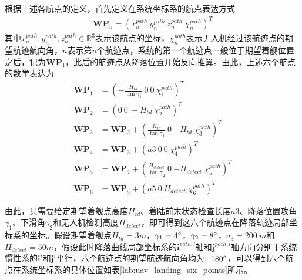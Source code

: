 根据上述各航点的定义，首先定义在系统坐标系的航点表达方式
\begin{align}
\mathbf{WP}_n = (x_n^{path}\ y_n^{path} \ z_n^{path}\ \chi_n^{path})^T
\end{align}
其中$x_n^{path}, y_n^{path}, z_n^{path} \in \mathbb{R}^3$表示该航点的坐标，$\chi_n^{path}$表示无人机经过该航迹点的期望航迹航向角，$n$表示第$n$个航迹点，系统的第一个航迹点一般位于期望着舰位置之后，记为$\mathbf{WP}_1$，此后的航迹点从降落位置开始反向推算。由此，上述六个航点的数学表达为
\begin{align}
\mathbf{WP}_1 &= (-\frac{H_{td}}{\tan{\gamma_1}}\ 0 \ 0\ \chi_1^{path})^T \\
\mathbf{WP}_2 &= (0\ 0 \ -H_{td}\ \chi_2^{path})^T \\
\mathbf{WP}_3 &= \mathbf{WP}_2 + (\frac{H_{td}}{\tan{\gamma_1}}\ 0 \ {-H_{td}}\ \chi_3^{path})^T\\
\mathbf{WP}_4 &= \mathbf{WP}_3+ (a3 \ 0 \ 0\ \chi_4^{path})^T \\
\mathbf{WP}_5 &= \mathbf{WP}_4 + (\frac{H_{detect}}{\tan{\gamma_2}}\ 0 \ {-H_{detect}}\ \chi_5^{path})^T \\
\mathbf{WP}_6 &= \mathbf{WP}_5 + (a5\ 0 \ H_{detect}\ \chi_6^{path})^T 
\end{align}

由此，只需要给定期望着舰点高度$H_{td}$、着陆前末状态检查长度$a3$、降落位置攻角$\gamma_1$、下滑角$\gamma_2$和无人机检测高度$H_{detect}$，即可得到这六个航迹点在降落轨迹局部坐标系的坐标。假设期望着舰点$H_{td} = 3 m$，$\gamma_1=4 \degree$，$\gamma_2=8\degree$，$a_3 = 200\ m$和$H_{detect} = 50 m$，假设此时降落曲线局部坐标系的$\mathbf{i}^{path,l}$轴和$\mathbf{j}^{path,l}$轴方向分别于系统惯性系的$\mathbf{i}^{i}$和$\mathbf{j}^i$平行，六个航迹点的期望航迹航向角均为$-180\degree$，可以得到六个航点在系统坐标系的具体位置如表\ref{lab:uav_landing_six_points}所示。

